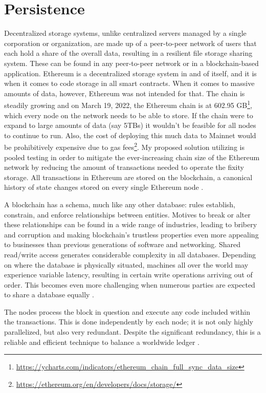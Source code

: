 \section{Persistence}\label{sec:persistence}
Decentralized storage systems, unlike centralized servers managed by a single corporation or organization, are made up of a peer-to-peer network of users that each hold a share of the overall data, resulting in a resilient file storage sharing system. These can be found in any peer-to-peer network or in a blockchain-based application. Ethereum is a decentralized storage system in and of itself, and it is when it comes to code storage in all smart contracts. When it comes to massive amounts of data, however, Ethereum was not intended for that. 
The chain is steadily growing and on March 19, 2022, the Ethereum chain is at 602.95 GB\footnote{\url{https://ycharts.com/indicators/ethereum_chain_full_sync_data_size}}, which every node on the network needs to be able to store. If the chain were to expand to large amounts of data (say 5TBs) it wouldn't be feasible for all nodes to continue to run. Also, the cost of deploying this much data to Mainnet would be prohibitively expensive due to gas fees\footnote{\url{https://ethereum.org/en/developers/docs/storage/}}.
My proposed solution utilizing is pooled testing in order to mitigate the ever-increasing chain size of the Ethereum network by reducing the amount of transactions needed to operate the fixity storage. 
All transactions in Ethereum are stored on the blockchain, a canonical history of state changes stored on every single Ethereum node \cite[12]{dannen2017introducing}.

A blockchain has a schema, much like any other database: rules establish, constrain, and enforce relationships between entities. Motives to break or alter these relationships can be found in a wide range of industries, leading to bribery and corruption and making blockchain's trustless properties even more appealing to businesses than previous generations of software and networking. Shared read/write access generates considerable complexity in all databases. Depending on where the database is physically situated, machines all over the world may experience variable latency, resulting in certain write operations arriving out of order. This becomes even more challenging when numerous parties are expected to share a database equally \cite[20]{dannen2017introducing}. 

The nodes process the block in question and execute any code included within the transactions. This is done independently by each node; it is not only highly parallelized, but also very redundant. Despite the significant redundancy, this is a reliable and efficient technique to balance a worldwide ledger \cite[50]{dannen2017introducing}.
